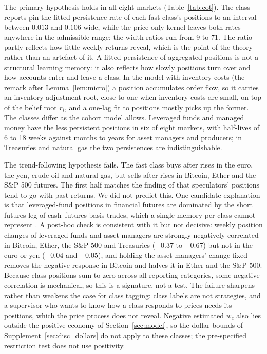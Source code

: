 \documentclass[12pt]{article}
\theoremstyle{definition}
\theoremstyle{remark}
\begin{document}
The primary hypothesis holds in all eight markets (Table~\ref{tab:cot}). The class reports pin the fitted persistence rate of each fast class's positions to an interval between $0.013$ and $0.106$ wide, while the price-only kernel leaves both rates anywhere in the admissible range; the width ratios run from 9 to 71. The ratio partly reflects how little weekly returns reveal, which is the point of the theory rather than an artefact of it. A fitted persistence of aggregated positions is not a structural learning memory: it also reflects how slowly positions turn over and how accounts enter and leave a class. In the model with inventory costs (the remark after Lemma~\ref{lem:micro}) a position accumulates order flow, so it carries an inventory-adjustment root, close to one when inventory costs are small, on top of the belief root $r_i$, and a one-lag fit to positions mostly picks up the former. The classes differ as the cohort model allows. Leveraged funds and managed money have the less persistent positions in six of eight markets, with half-lives of 6 to 18 weeks against months to years for asset managers and producers; in Treasuries and natural gas the two persistences are indistinguishable.

The trend-following hypothesis fails. The fast class buys after rises in the euro, the yen, crude oil and natural gas, but sells after rises in Bitcoin, Ether and the S\&P 500 futures. The first half matches the finding of \citet{moskowitz2012} that speculators' positions tend to go with past returns. We did not predict this. One candidate explanation is that leveraged-fund positions in financial futures are dominated by the short futures leg of cash--futures basis trades, which a single memory per class cannot represent \citep{barth2021}. A post-hoc check is consistent with it but not decisive: weekly position changes of leveraged funds and asset managers are strongly negatively correlated in Bitcoin, Ether, the S\&P 500 and Treasuries ($-0.37$ to $-0.67$) but not in the euro or yen ($-0.04$ and $-0.05$), and holding the asset managers' change fixed removes the negative response in Bitcoin and halves it in Ether and the S\&P 500. Because class positions sum to zero across all reporting categories, some negative correlation is mechanical, so this is a signature, not a test. The failure sharpens rather than weakens the case for class tagging: class labels are not strategies, and a supervisor who wants to know how a class responds to prices needs its positions, which the price process does not reveal. Negative estimated $w_c$ also lies outside the positive economy of Section~\ref{sec:model}, so the dollar bounds of Supplement~\ref{sec:disc_dollars} do not apply to these classes; the pre-specified restriction test does not use positivity.
\end{document}
